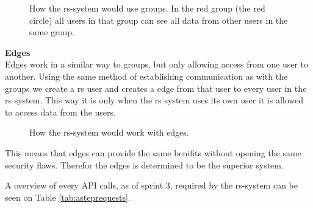 \begin{figure}[h]
	\centering
	\label{fig:astepgroup}
	\caption{How the \gls{rs}-system would use groups. In the red group (the red circle) all users in that group can see all data from other users in the same group.}
\end{figure}

\textbf{Edges}\\ 
Edges work in a similar way to groups, but only allowing access from one user to another.
Using the same method of establishing communication as with the groups we create a \gls{rs} user and creates a edge from that user to every user in the \gls{rs} system.
This way it is only when the \gls{rs} system uses its own user it is allowed to access data from the users.

\begin{figure}[h]
	\centering
	\label{fig:astepgroup}
	\caption{How the \gls{rs}-system would work with edges.}
\end{figure}

This means that edges can provide the same benifits without opening the same security flaws.
Therefor the edges is determined to be the superior system.

A  overview of every API calls, as of sprint 3, required by the \gls{rs}-system can be seen on Table \ref{tab:asteprequests}.


